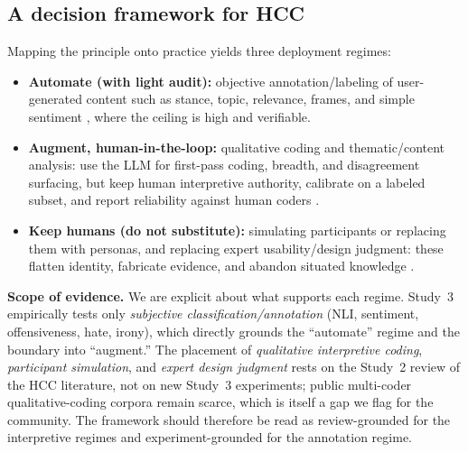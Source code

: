 \subsection{A decision framework for HCC}
Mapping the principle onto practice yields three deployment regimes:
\begin{itemize}[leftmargin=1.4em,itemsep=2pt]
\item \textbf{Automate (with light audit):} objective annotation/labeling of user-generated content such as
stance, topic, relevance, frames, and simple sentiment \citep{gilardi2023chatgpt,tornberg2023political}, where the
ceiling is high and verifiable.
\item \textbf{Augment, human-in-the-loop:} qualitative coding and thematic/content analysis: use the LLM for
first-pass coding, breadth, and disagreement surfacing, but keep human interpretive authority, calibrate on a
labeled subset, and report reliability against human coders \citep{gao2024collabcoder,meng2024chalet,
pangakis2023validation}.
\item \textbf{Keep humans (do not substitute):} simulating participants or replacing them with personas, and
replacing expert usability/design judgment: these flatten identity, fabricate evidence, and abandon situated
knowledge \citep{wang2024flatten,guerino2025gpt4ousability,salminen2025syntheticcritical}.
\end{itemize}
\textbf{Scope of evidence.} We are explicit about what supports each regime. Study~3 empirically tests only
\emph{subjective classification/annotation} (NLI, sentiment, offensiveness, hate, irony), which directly grounds the
``automate'' regime and the boundary into ``augment.'' The placement of \emph{qualitative interpretive coding},
\emph{participant simulation}, and \emph{expert design judgment} rests on the Study~2 review of the HCC literature,
not on new Study~3 experiments; public multi-coder qualitative-coding corpora remain scarce, which is itself a gap
we flag for the community. The framework should therefore be read as review-grounded for the interpretive regimes and
experiment-grounded for the annotation regime.

